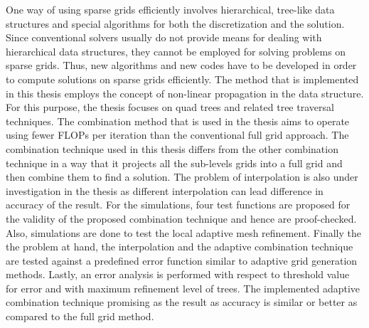 One way of using sparse grids efficiently involves hierarchical, tree-like data structures and special algorithms for both the discretization and the solution. Since conventional solvers usually do not provide means for dealing with hierarchical data structures, they cannot be employed for solving problems on sparse grids. Thus, new algorithms and new codes have to be developed in order to compute solutions on sparse grids efficiently. The method that is implemented in this thesis employs the concept of non-linear propagation  in the data structure. For this purpose, the thesis focuses on quad trees and related tree traversal techniques.  The combination method that is used in the thesis aims to operate using fewer FLOPs per iteration than the conventional full grid approach. The combination technique used in this thesis differs from the other combination technique in a way that it projects all the sub-levels grids into a full grid and then combine them to find a solution. The problem of interpolation is also under investigation in the thesis as different interpolation can lead difference in accuracy of the result.
For the simulations, four test functions are proposed for the validity of the proposed combination technique and hence are proof-checked. Also, simulations are done to test the local adaptive mesh refinement. Finally the the problem at hand, the interpolation and the adaptive combination technique are tested against a predefined error function similar to adaptive grid generation methods. Lastly, an error analysis is performed with respect to threshold value for error and with maximum refinement level of trees. The implemented adaptive combination technique promising as the result as accuracy is similar or better as compared to the full grid method.
